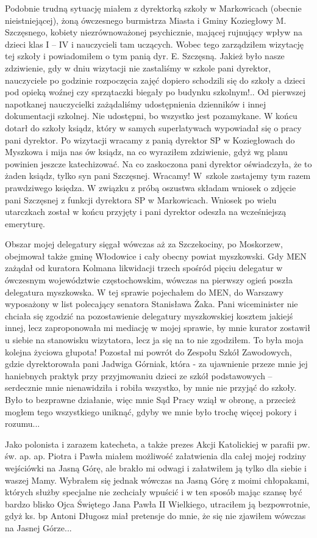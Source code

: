 Podobnie trudną sytuację miałem z dyrektorką szkoły w Markowicach (obecnie nieistniejącej), żoną ówczesnego burmistrza Miasta i Gminy Koziegłowy M. Szczęsnego, kobiety niezrównoważonej psychicznie, mającej rujnujący wpływ na dzieci klas I – IV i nauczycieli tam uczących. Wobec tego  zarządziłem wizytację tej szkoły i powiadomiłem o tym panią dyr.  E. Szczęsną. Jakież było nasze zdziwienie, gdy w dniu wizytacji nie zastaliśmy w szkole pani dyrektor, nauczyciele po godzinie rozpoczęcia zajęć dopiero schodzili się do szkoły a dzieci pod opieką woźnej czy sprzątaczki biegały po budynku szkolnym!.. Od pierwszej napotkanej nauczycielki zażądaliśmy udostępnienia dzienników i innej dokumentacji szkolnej. Nie udostępni, bo wszystko jest pozamykane. W końcu dotarł do szkoły ksiądz, który w samych superlatywach wypowiadał się o pracy pani dyrektor. Po wizytacji wracamy z panią dyrektor SP w Koziegłowach do Myszkowa i mija nas ów ksiądz, na co wyraziłem zdziwienie, gdyż wg planu powinien jeszcze katechizować. Na co zaskoczona pani dyrektor oświadczyła, że to żaden ksiądz, tylko syn pani Szczęsnej. Wracamy! W~szkole zastajemy tym razem prawdziwego księdza. W związku z próbą oszustwa składam wniosek o zdjęcie pani Szczęsnej z funkcji dyrektora SP w Markowicach. Wniosek po wielu utarczkach został w końcu przyjęty i pani dyrektor odeszła na wcześniejszą emeryturę.

Obszar mojej delegatury sięgał wówczas aż za Szczekociny, po Moskorzew, obejmował także gminę Włodowice i cały obecny powiat myszkowski. Gdy MEN zażądał od kuratora Kolmana likwidacji trzech spośród pięciu delegatur w ówczesnym województwie częstochowskim, wówczas na pierwszy ogień poszła delegatura myszkowska. W tej sprawie pojechałem do MEN, do Warszawy wyposażony w list polecający senatora Stanisława Żaka. Pani wiceminister nie chciała się zgodzić na pozostawienie delegatury myszkowskiej kosztem jakiejś innej, lecz zaproponowała mi mediację w mojej sprawie, by mnie kurator zostawił u siebie na stanowisku wizytatora, lecz ja się na to nie zgodziłem. To była moja kolejna życiowa głupota! Pozostał mi powrót do Zespołu Szkół Zawodowych, gdzie dyrektorowała pani Jadwiga Górniak, która - za ujawnienie przeze mnie jej haniebnych praktyk przy przyjmowaniu dzieci ze szkół podstawowych – serdecznie mnie nienawidziła i robiła wszystko, by mnie nie przyjąć do szkoły. Było to bezprawne działanie, więc mnie Sąd Pracy wziął w obronę, a przecież mogłem tego wszystkiego uniknąć, gdyby we mnie było trochę więcej pokory i rozumu...

Jako polonista i zarazem katecheta, a także prezes Akcji Katolickiej w parafii pw. św. ap. ap. Piotra i Pawła miałem możliwość załatwienia dla całej mojej rodziny wejściówki na Jasną Górę, ale brakło mi odwagi i załatwiłem ją tylko dla siebie i waszej Mamy. Wybrałem się jednak wówczas na Jasną Górę z moimi chłopakami, których służby specjalne nie zechciały wpuścić i w ten sposób mając szansę być bardzo blisko Ojca Świętego Jana Pawła II Wielkiego, utraciłem ją bezpowrotnie, gdyż ks. bp Antoni Długosz miał pretensje do mnie, że się nie zjawiłem wówczas na Jasnej Górze...

